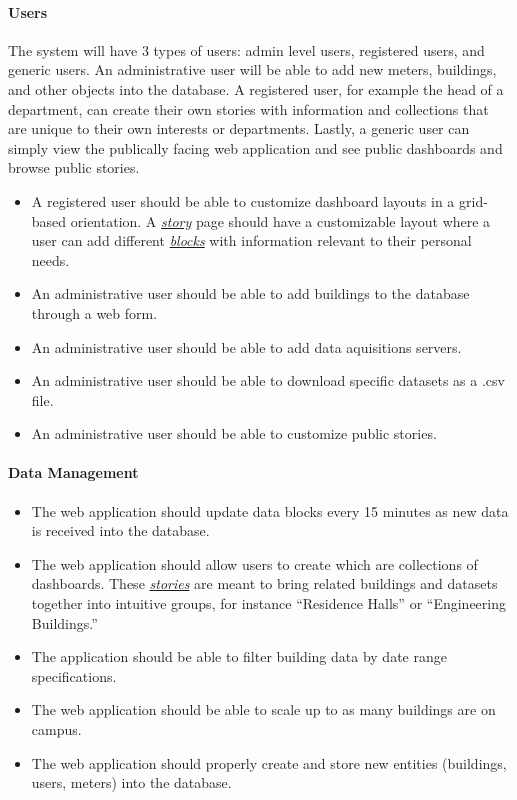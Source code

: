     \paragraph{Users}
    The system will have 3 types of users: admin level users, registered users, and generic users. An administrative user will be able to add new meters, buildings, and other objects into the database. A registered user, for example the head of a department, can create their own stories with information and collections that are unique to their own interests or departments. Lastly, a generic user can simply view the publically facing web application and see public dashboards and browse public stories. 
    \begin{itemize}
        \setlength\itemsep{1mm}
        \item A registered user should be able to customize dashboard layouts in a grid-based orientation. A \hyperref[definition]{\textit{story}} page should have a customizable layout where a user can add different \hyperref[definition]{\textit{blocks}} with information relevant to their personal needs.
        \item An administrative user should be able to add buildings to the database through a web form.
        \item An administrative user should be able to add data aquisitions servers.
        \item An administrative user should be able to download specific datasets as a .csv file.
        \item An administrative user should be able to customize public stories.
    \end{itemize}

    \paragraph{Data Management}
    \begin{itemize}
        \setlength\itemsep{1mm}
        \item The web application should update data blocks every 15 minutes as new data is received into the database.
        \item The web application should allow users to create  which are collections of dashboards. These 
        \hyperref[definition]{\textit{stories}} are meant to bring related buildings and datasets together into intuitive groups, for instance ``Residence Halls'' or ``Engineering Buildings.''
        \item The application should be able to filter building data by date range specifications.
        \item The web application should be able to scale up to as many buildings are on campus.
        \item The web application should properly create and store new entities (buildings, users, meters) into the database.
        
    \end{itemize}    

